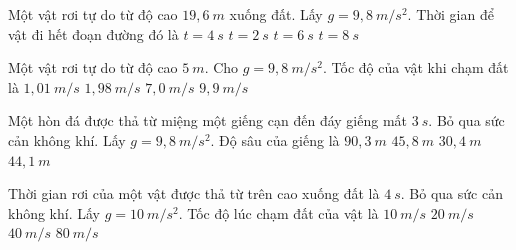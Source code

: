 \begin{vidu} %
Một vật rơi tự do từ độ cao $19,6\ m$ xuống đất. Lấy $g = 9,8\  m/s^2$. Thời gian để vật đi hết đoạn đường đó là
\choice
{$t = 4\ s$}
{\True $t = 2\ s$}
{$t = 6\ s$}
{$t = 8\ s$}
 \end{vidu}
\begin{vidu} %
Một vật rơi tự do từ độ cao $5\ m$. Cho $g = 9,8\  m/s^2$. Tốc độ của vật khi chạm đất là
\choice
{$1,01\  m/s$}
{$1,98\  m/s$}
{$7,0\  m/s$}
{\True $9,9\  m/s$}
 \end{vidu}
\begin{vidu}%
Một hòn đá được thả từ miệng một giếng cạn đến đáy giếng mất $3\ s$. Bỏ qua sức cản không khí. Lấy $g = 9,8\ m/s^2$. Độ sâu của giếng là
\choice
{$90,3\ m$}
{$45,8\ m$}
{$30,4\ m$}
{\True $44,1\  m$}
 \end{vidu}
\begin{vidu}%
Thời gian rơi của một vật được thả từ trên cao xuống đất là $4\ s$. Bỏ qua sức cản không khí. Lấy $g = 10\ m/s^2$. Tốc độ lúc chạm đất của vật là
\choice
{$10\ m/s$}
{$20\ m/s$}
{\True $40\ m/s$}
{$80\ m/s$}
 \end{vidu}
